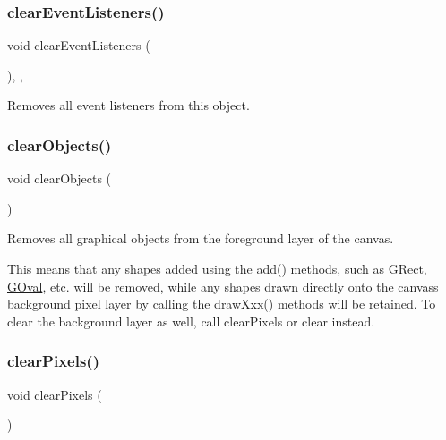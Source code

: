 \subsubsection{\texorpdfstring{clear\+Event\+Listeners()}{clearEventListeners()}}
{\footnotesize\ttfamily void clear\+Event\+Listeners (\begin{DoxyParamCaption}{ }\end{DoxyParamCaption})\hspace{0.3cm}{\ttfamily [protected]}, {\ttfamily [virtual]}, {\ttfamily [inherited]}}



Removes all event listeners from this object. 

\mbox{\label{classGCanvas_a6614e1320bc8e93b20df129613e5a0ff}} 
\subsubsection{\texorpdfstring{clear\+Objects()}{clearObjects()}}
{\footnotesize\ttfamily void clear\+Objects (\begin{DoxyParamCaption}{ }\end{DoxyParamCaption})\hspace{0.3cm}{\ttfamily [virtual]}}



Removes all graphical objects from the foreground layer of the canvas. 

This means that any shapes added using the \mbox{\hyperlink{classGCanvas_afe8277e7b2627513c6f7452fb0b2847d}{add()}} methods, such as \mbox{\hyperlink{classGRect}{G\+Rect}}, \mbox{\hyperlink{classGOval}{G\+Oval}}, etc. will be removed, while any shapes drawn directly onto the canvas\textquotesingle{}s background pixel layer by calling the draw\+Xxx() methods will be retained. To clear the background layer as well, call clear\+Pixels or clear instead. \mbox{\label{classGCanvas_ab2c8590176aec1da6fb4e9b836bab630}} 
\subsubsection{\texorpdfstring{clear\+Pixels()}{clearPixels()}}
{\footnotesize\ttfamily void clear\+Pixels (\begin{DoxyParamCaption}{ }\end{DoxyParamCaption})\hspace{0.3cm}{\ttfamily [virtual]}}




